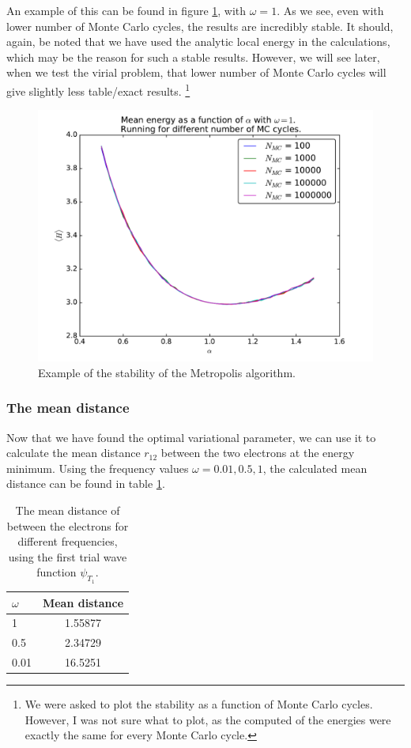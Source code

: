 \documentclass[12pt]{article}
\begin{document}
An example of this can be found in figure \ref{fig:Stability_1}, with $\omega = 1$. As we see, even with lower number of Monte Carlo cycles, the results are incredibly stable. It should, again, be noted that we have used the analytic local energy in the calculations, which may be the reason for such a stable results. However, we will see later, when we test the virial problem, that lower number of Monte Carlo cycles will give slightly less table/exact results. \footnote{We were asked to plot the stability as a function of Monte Carlo cycles. However, I was not sure what to plot, as the computed of the energies were exactly the same for every Monte Carlo cycle.}
\begin{figure}[h]
\centering
\includegraphics[width=\linewidth]{Plots/Stability_check.pdf}
\caption{Example of the stability of the Metropolis algorithm.}
\label{fig:Stability_1}
\end{figure}

\FloatBarrier
\subsubsection{The mean distance}
Now that we have found the optimal variational parameter, we can use it to calculate the mean distance $r_{12}$ between the two electrons at the energy minimum. Using the frequency values $\omega = 0.01, 0.5, 1$, the calculated mean distance  can be found in table \ref{table:Mean_Distance}.
\begin{table}
\begin{center}
	\begin{tabular}{| l | c |}
	\hline 
	$\omega$ & Mean distance \\ \hline
	1 & 1.55877 \\ 
	0.5 & 2.34729 \\
	0.01 & 16.5251 \\ \hline
	\end{tabular}
\caption{The mean distance of between the electrons for different frequencies, using the first trial wave function $\psi_{T_1}$.}
\label{table:Mean_Distance}
\end{center}
\end{table}
\end{document}
